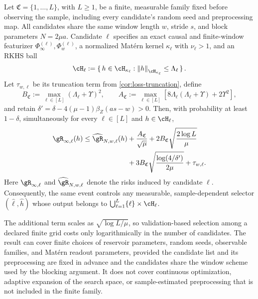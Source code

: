 \begin{corollary}
\label{cor:finite-family-selection}
Let \(\mathfrak C=\{1,\ldots,L\}\), with \(L\geq1\), be a finite,
measurable family fixed before observing the sample, including every candidate's
random seed and preprocessing map. All candidates share the same window length
\(w\), stride \(s\), and block parameters \(N=2\mu a\). Candidate
\(\ell\) specifies an exact causal and finite-window featurizer
\(\Phi_\infty^{(\ell)},\Phi_w^{(\ell)}\), a normalized Mat\'ern kernel
\(\kappa_\ell\) with \(\nu_\ell>1\), and an RKHS ball
\[
    \cH_\ell
    :=
    \set{h\in\cH_{\kappa_\ell}:\norm{h}_{\cH_{\kappa_\ell}}\leq\Lambda_\ell}.
\]
Let \(\tau_{w,\ell}\) be its truncation term from
\cref{cor:loss-truncation}, define
\[
    B_{\mathfrak C}
    :=
    \max_{\ell\in[L]}(\Lambda_\ell+\Upsilon)^2,
    \qquad
    A_{\mathfrak C}
    :=
    \max_{\ell\in[L]}
    \left[8\Lambda_\ell(\Lambda_\ell+\Upsilon)+2\Upsilon^2\right],
\]
and retain \(\delta'=\delta-4(\mu-1)\beta_Z(as-w)>0\). Then, with
probability at least \(1-\delta\), simultaneously for every
\(\ell\in[L]\) and \(h\in\cH_\ell\),
\begin{align}
    \risk_{\infty,\ell}(h)
    \leq
    \erisk_{N,w,\ell}(h)
    &+\frac{A_{\mathfrak C}}{\sqrt\mu}
    +2B_{\mathfrak C}
      \sqrt{\frac{2\log L}{\mu}}
    \notag\\
    &+3B_{\mathfrak C}
      \sqrt{\frac{\log(4/\delta')}{2\mu}}
    +\tau_{w,\ell}.
    \label{eq:finite-family-bound}
\end{align}
Here \(\risk_{\infty,\ell}\) and \(\erisk_{N,w,\ell}\) denote the risks
induced by candidate \(\ell\). Consequently, the same event controls any
measurable, sample-dependent selector \((\widehat\ell,\widehat h)\) whose
output belongs to \(\bigcup_{\ell=1}^L\{\ell\}\times\cH_\ell\).
\end{corollary}

The additional term scales as \(\sqrt{\log L/\mu}\), so validation-based
selection among a declared finite grid costs only logarithmically in the number
of candidates. The result can cover finite choices of reservoir parameters,
random seeds, observable families, and Mat\'ern readout parameters, provided
the candidate list and its preprocessing are fixed in advance and the candidates
share the window scheme used by the blocking argument. It does not cover
continuous optimization, adaptive expansion of the search space, or
sample-estimated preprocessing that is not included in the finite family.

